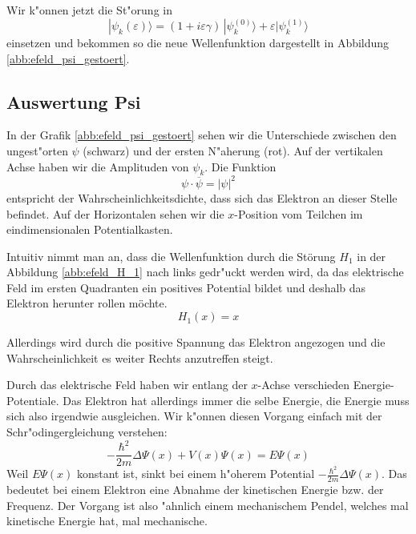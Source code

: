 \begin{refsection}
Wir k"onnen jetzt die St"orung in 
\begin{equation}
|\psi_k(\varepsilon)\rangle
=
(1+i\varepsilon \gamma)
\,|\psi_k^{(0)}\rangle
+
\varepsilon|\psi_k^{(1)}\rangle
\end{equation}
einsetzen und bekommen so die neue Wellenfunktion dargestellt in Abbildung \ref{abb:efeld_psi_gestoert}.




\subsection{Auswertung Psi}

In der Grafik \ref{abb:efeld_psi_gestoert} sehen wir die Unterschiede zwischen den ungest"orten 
$\psi$ (schwarz) und der ersten N"aherung (rot).
Auf der vertikalen Achse haben wir die Amplituden von $\psi_k$.
Die Funktion 
\[
  \psi \cdot \overline{\psi} = |\psi|^2
\]
entspricht der Wahrscheinlichkeitsdichte, 
dass sich das Elektron an dieser Stelle befindet.
Auf der Horizontalen sehen wir die $x$-Position vom Teilchen im eindimensionalen Potentialkasten.

Intuitiv nimmt man an, dass die Wellenfunktion durch die St\"orung $H_1$ in der Abbildung 
\ref{abb:efeld_H_1} nach links gedr"uckt werden wird, da das elektrische Feld 
im ersten Quadranten ein positives Potential bildet und deshalb das Elektron herunter rollen m\"ochte.
\[
  H_1(x) = x
\]

Allerdings wird durch die positive Spannung das Elektron angezogen und die
Wahrscheinlichkeit es weiter Rechts anzutreffen steigt.

Durch das elektrische Feld haben wir entlang der $x$-Achse verschieden Energie-Potentiale.
Das Elektron hat allerdings immer die selbe Energie,
die Energie muss sich also irgendwie ausgleichen.
Wir k"onnen diesen Vorgang einfach mit der Schr"odingergleichung verstehen:
\[
-\frac{\hbar^2}{2m}\Delta\Psi(x) + V(x)\Psi(x)
=
E \Psi(x)
\]
Weil $E \Psi(x)$ konstant ist, sinkt bei einem h"oherem Potential $-\frac{\hbar^2}{2m}\Delta\Psi(x)$.
Das bedeutet bei einem Elektron eine Abnahme der kinetischen Energie bzw. der Frequenz.
Der Vorgang ist also "ahnlich einem mechanischem Pendel, 
welches mal kinetische Energie hat, mal mechanische.


\end{refsection}
